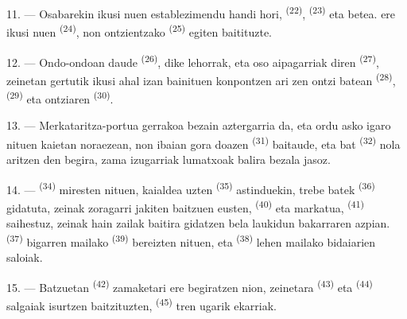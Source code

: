\VUsaut{3.0mm}
\VUsaut{3.0mm}

11. --- Osabarekin ikusi nuen establezimendu handi hori, 
\textsuperscript{(22)},  \textsuperscript{(23)} eta
 betea.  ere ikusi nuen
\textsuperscript{(24)}, non ontzientzako 
\textsuperscript{(25)} egiten baitituzte.

12. --- Ondo-ondoan  daude \textsuperscript{(26)}, dike lehorrak,
eta oso aipagarriak diren  \textsuperscript{(27)},
zeinetan gertutik ikusi ahal izan bainituen konpontzen ari zen ontzi batean
 \textsuperscript{(28)},  \textsuperscript{(29)} eta
ontziaren  \textsuperscript{(30)}.

13. --- Merkataritza-portua gerrakoa bezain aztergarria da, eta ordu asko igaro
nituen kaietan noraezean, non ibaian gora doazen 
\textsuperscript{(31)} baitaude, eta  bat
\textsuperscript{(32)} nola aritzen den begira, zama izugarriak lumatxoak balira
bezala jasoz.

\VUsaut{4.0mm}
\VUsaut{3.0mm}

14. ---  \textsuperscript{(34)} miresten nituen,
kaialdea uzten  \textsuperscript{(35)} astinduekin, 
trebe batek \textsuperscript{(36)} gidatuta, zeinak zoragarri jakiten baitzuen
 eusten,  \textsuperscript{(40)} eta
 markatua,  \textsuperscript{(41)}
saihestuz, zeinak hain zailak baitira gidatzen bela laukidun bakarraren azpian.
 \textsuperscript{(37)} bigarren mailako 
\textsuperscript{(39)} bereizten nituen, eta 
\textsuperscript{(38)} lehen mailako bidaiarien saloiak.

15. --- Batzuetan  \textsuperscript{(42)} zamaketari ere
begiratzen nion, zeinetara  \textsuperscript{(43)} eta
 \textsuperscript{(44)} salgaiak isurtzen baitzituzten,
 \textsuperscript{(45)} tren ugarik ekarriak.

\VUsaut{3.0mm}
\VUsaut{3.0mm}

